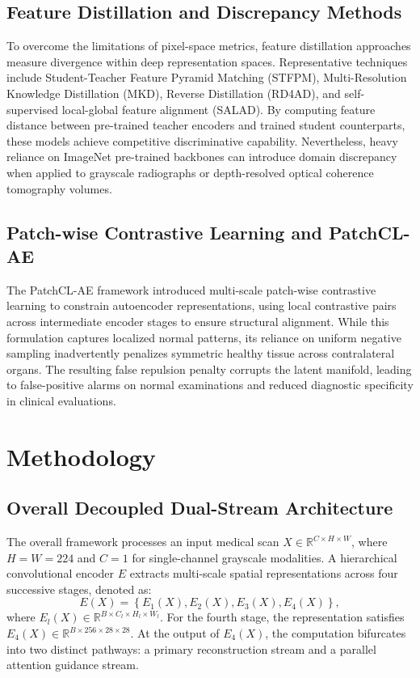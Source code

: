 \documentclass[journal]{IEEEtran}
\begin{document}
\subsection{Feature Distillation and Discrepancy Methods}
To overcome the limitations of pixel-space metrics, feature distillation approaches measure divergence within deep representation spaces. Representative techniques include Student-Teacher Feature Pyramid Matching (STFPM), Multi-Resolution Knowledge Distillation (MKD), Reverse Distillation (RD4AD), and self-supervised local-global feature alignment (SALAD). By computing feature distance between pre-trained teacher encoders and trained student counterparts, these models achieve competitive discriminative capability. Nevertheless, heavy reliance on ImageNet pre-trained backbones can introduce domain discrepancy when applied to grayscale radiographs or depth-resolved optical coherence tomography volumes.

\subsection{Patch-wise Contrastive Learning and PatchCL-AE}
The PatchCL-AE framework introduced multi-scale patch-wise contrastive learning to constrain autoencoder representations, using local contrastive pairs across intermediate encoder stages to ensure structural alignment. While this formulation captures localized normal patterns, its reliance on uniform negative sampling inadvertently penalizes symmetric healthy tissue across contralateral organs. The resulting false repulsion penalty corrupts the latent manifold, leading to false-positive alarms on normal examinations and reduced diagnostic specificity in clinical evaluations.

\section{Methodology}

\subsection{Overall Decoupled Dual-Stream Architecture}
The overall framework processes an input medical scan $X \in \mathbb{R}^{C \times H \times W}$, where $H=W=224$ and $C=1$ for single-channel grayscale modalities. A hierarchical convolutional encoder $E$ extracts multi-scale spatial representations across four successive stages, denoted as:
\begin{equation}
E(X) = \left\{E_1(X), E_2(X), E_3(X), E_4(X)\right\},
\end{equation}
where $E_l(X) \in \mathbb{R}^{B \times C_l \times H_l \times W_l}$. For the fourth stage, the representation satisfies $E_4(X) \in \mathbb{R}^{B \times 256 \times 28 \times 28}$. At the output of $E_4(X)$, the computation bifurcates into two distinct pathways: a primary reconstruction stream and a parallel attention guidance stream.
\end{document}

